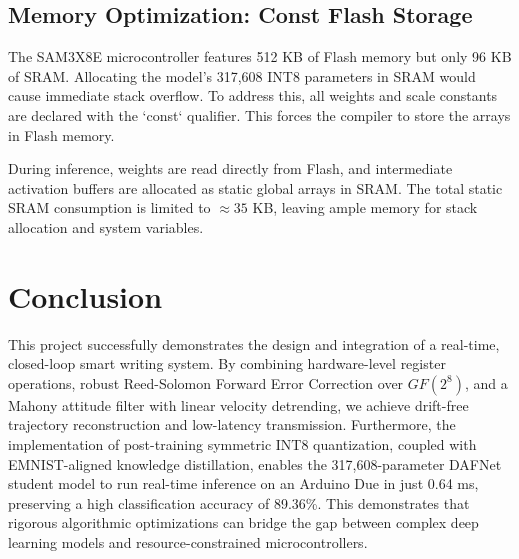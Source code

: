 \documentclass[12pt,a4paper]{article}
\begin{document}
\subsection{Memory Optimization: Const Flash Storage}
The SAM3X8E microcontroller features 512 KB of Flash memory but only 96 KB of SRAM. Allocating the model's 317,608 INT8 parameters in SRAM would cause immediate stack overflow. To address this, all weights and scale constants are declared with the `const` qualifier. This forces the compiler to store the arrays in Flash memory. 

During inference, weights are read directly from Flash, and intermediate activation buffers are allocated as static global arrays in SRAM. The total static SRAM consumption is limited to $\approx 35$ KB, leaving ample memory for stack allocation and system variables.

\section{Conclusion}
This project successfully demonstrates the design and integration of a real-time, closed-loop smart writing system. By combining hardware-level register operations, robust Reed-Solomon Forward Error Correction over $GF(2^8)$, and a Mahony attitude filter with linear velocity detrending, we achieve drift-free trajectory reconstruction and low-latency transmission. Furthermore, the implementation of post-training symmetric INT8 quantization, coupled with EMNIST-aligned knowledge distillation, enables the 317,608-parameter DAFNet student model to run real-time inference on an Arduino Due in just 0.64 ms, preserving a high classification accuracy of 89.36\%. This demonstrates that rigorous algorithmic optimizations can bridge the gap between complex deep learning models and resource-constrained microcontrollers.
\end{document}
